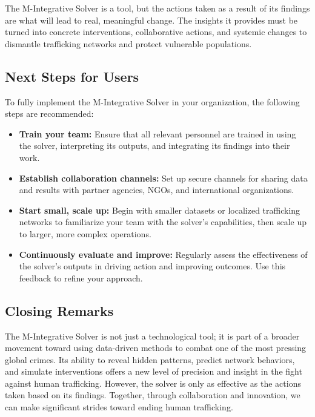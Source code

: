 \documentclass[%
 preprint, linenumbers,
 amsmath,amssymb,
 aps, physrev,
]{revtex4-2}
\begin{document}
The M-Integrative Solver is a tool, but the actions taken as a result of its findings are what will lead to real, meaningful change. The insights it provides must be turned into concrete interventions, collaborative actions, and systemic changes to dismantle trafficking networks and protect vulnerable populations.

\subsection{Next Steps for Users}

To fully implement the M-Integrative Solver in your organization, the following steps are recommended:
\begin{itemize}
    \item \textbf{Train your team:} Ensure that all relevant personnel are trained in using the solver, interpreting its outputs, and integrating its findings into their work.
    \item \textbf{Establish collaboration channels:} Set up secure channels for sharing data and results with partner agencies, NGOs, and international organizations.
    \item \textbf{Start small, scale up:} Begin with smaller datasets or localized trafficking networks to familiarize your team with the solver’s capabilities, then scale up to larger, more complex operations.
    \item \textbf{Continuously evaluate and improve:} Regularly assess the effectiveness of the solver’s outputs in driving action and improving outcomes. Use this feedback to refine your approach.
\end{itemize}

\subsection{Closing Remarks}

The M-Integrative Solver is not just a technological tool; it is part of a broader movement toward using data-driven methods to combat one of the most pressing global crimes. Its ability to reveal hidden patterns, predict network behaviors, and simulate interventions offers a new level of precision and insight in the fight against human trafficking. However, the solver is only as effective as the actions taken based on its findings. Together, through collaboration and innovation, we can make significant strides toward ending human trafficking.
\end{document}
